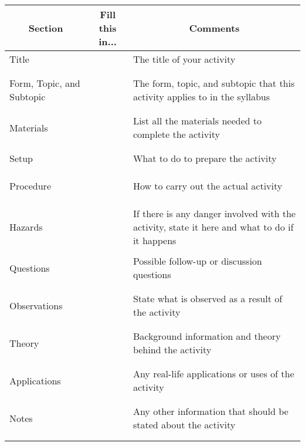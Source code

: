 \begin{center}
\begin{tabular}{|p{3cm}|p{6cm}|p{6cm}|}
\hline
\multicolumn{1}{|c|}{\textbf{Section}}&\multicolumn{1}{|c|}{\textbf{Fill this in...}}&\multicolumn{1}{|c|}{\textbf{Comments}}\\ \hline
Title&&The title of your activity\\ 
&&\\
&&\\ \hline
Form, Topic, and Subtopic&&The form, topic, and subtopic that this activity applies to in the syllabus\\
&&\\
&&\\ \hline
Materials&&List all the materials needed to complete the activity\\
&&\\
&&\\ \hline
Setup&&What to do to prepare the activity\\
&&\\
&&\\
&&\\ \hline
Procedure&&How to carry out the actual activity\\
&&\\
&&\\
&&\\ \hline
Hazards&&If there is any danger involved with the activity, state it here and what to do if it happens\\
&&\\ \hline
Questions&&Possible follow-up or discussion questions\\
&&\\
&&\\ \hline
Observations&&State what is observed as a result of the activity\\
&&\\
&&\\ \hline
Theory&&Background information and theory behind the activity\\
&&\\
&&\\ \hline
Applications&&Any real-life applications or uses of the activity\\
&&\\
&&\\ \hline
Notes&&Any other information that should be stated about the activity\\
&&\\
&&\\ \hline
\end{tabular}
\end{center}
